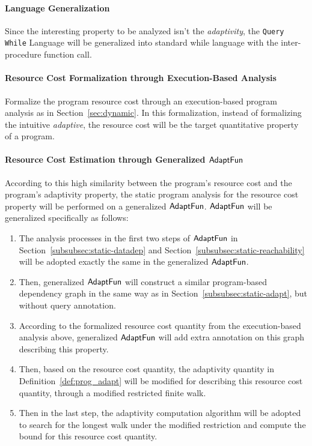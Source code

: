 \paragraph*{Language Generalization} Since the interesting property 
to be analyzed isn't the \emph{adaptivity},
the {\tt Query While} Language will be generalized into standard while language with the inter-procedure function call.
\paragraph*{Resource Cost Formalization through Execution-Based Analysis} 
Formalize the program resource cost through an execution-based program analysis as in Section~\ref{sec:dynamic}.
In this formalization, instead of formalizing the intuitive \emph{adaptive}, the resource cost will be the
target quantitative property of a program.
\paragraph*{Resource Cost Estimation through Generalized $\textsf{AdaptFun}$}
According to this high similarity between the program's resource cost and the 
program's adaptivity property, the static program analysis for the resource cost property will 
be performed on a generalized $\textsf{AdaptFun}$. $\textsf{AdaptFun}$ will be generalized specifically as follows:
\begin{enumerate}
 \item The analysis processes in the first two steps of $\textsf{AdaptFun}$ in Section~\ref{subsubsec:static-datadep}
 and Section~\ref{subsubsec:static-reachability} will be adopted exactly the same in the generalized $\textsf{AdaptFun}$.
 \item Then, generalized $\textsf{AdaptFun}$ will construct a similar program-based dependency graph 
 in the same way as in Section~\ref*{subsubsec:static-adapt}, but without query annotation. 
 \item According to the formalized resource cost quantity from the execution-based analysis above,
 generalized $\textsf{AdaptFun}$ will add extra annotation on this graph describing this property.
 \item Then, based on the resource cost quantity, the adaptivity quantity in Definition~\ref{def:prog_adapt}
 will be modified for describing this resource cost quantity, through a modified restricted finite walk.
 \item Then in the last step, the adaptivity computation algorithm will be adopted to search for the longest 
 walk under the modified restriction and compute the bound for 
 this resource cost quantity.
\end{enumerate}


